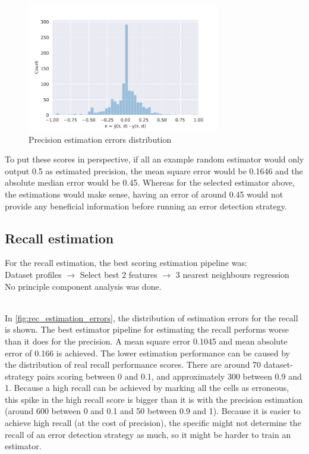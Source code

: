 \begin{figure}[h]
    \centering
    \includegraphics[width=0.75\textwidth]{thesis/Figures/RQ2/15_error_histogramcell_prec.pdf}
    \caption{Precision estimation errors distribution}
    \label{fig:prec_estimation_errors}
\end{figure}

To put these scores in perspective, if all an example random estimator would only output 0.5 as estimated precision, the mean square error would be 0.1646 and the absolute median error would be 0.45. Whereas for the selected estimator above, the estimations would make sense, having an error of around 0.45 would not provide any beneficial information before running an error detection strategy. 

\subsection{Recall estimation}
For the recall estimation, the best scoring estimation pipeline was:
~\\Dataset profiles $\rightarrow$ Select best 2 features $\rightarrow$ 3 nearest neighbours regression
\\No principle component analysis was done. 

~\\In \autoref{fig:rec_estimation_errors}, the distribution of estimation errors for the recall is shown. The best estimator pipeline for estimating the recall performs worse than it does for the precision. A mean square error 0.1045 and mean absolute error of 0.166 is achieved. The lower estimation performance can be caused by the distribution of real recall performance scores. There are around 70 dataset-strategy pairs scoring between 0 and 0.1, and approximately 300 between 0.9 and 1. Because a high recall can be achieved by marking all the cells as erroneous, this spike in the high recall score is bigger than it is with the precision estimation (around 600 between 0 and 0.1 and 50 between 0.9 and 1). Because it is easier to achieve high recall (at the cost of precision), the specific might not determine the recall of an error detection strategy as much, so it might be harder to train an estimator.


